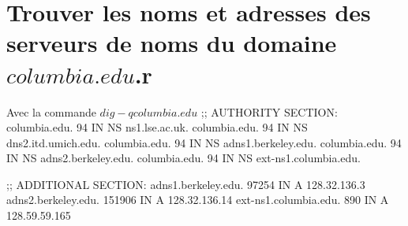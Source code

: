 \section{Trouver les noms et adresses des serveurs de noms du domaine $columbia.edu$.r}
Avec la commande $dig -q columbia.edu$
;; AUTHORITY SECTION:
columbia.edu.		94	IN	NS	ns1.lse.ac.uk.
columbia.edu.		94	IN	NS	dns2.itd.umich.edu.
columbia.edu.		94	IN	NS	adns1.berkeley.edu.
columbia.edu.		94	IN	NS	adns2.berkeley.edu.
columbia.edu.		94	IN	NS	ext-ns1.columbia.edu.

;; ADDITIONAL SECTION:
adns1.berkeley.edu.	97254	IN	A	128.32.136.3
adns2.berkeley.edu.	151906	IN	A	128.32.136.14
ext-ns1.columbia.edu.	890	IN	A	128.59.59.165


